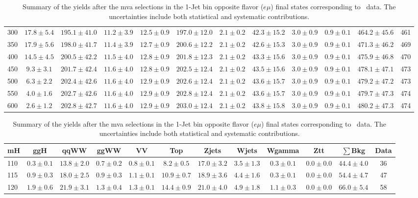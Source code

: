 \begin{table}[!ht]
{\begin{center}
\begin{tabular}{l c c c c c c c c c c c }
300 & $17.8\pm5.4$ & $195.1\pm41.0$ & $11.2\pm3.9$ & $12.5\pm0.9$ & $197.0\pm12.0$ & $2.1\pm0.2$ & $42.3\pm15.2$ & $3.0\pm0.9$ & $0.9\pm0.1$ & $464.2\pm45.6$ & 461 \\
350 & $17.9\pm5.6$ & $198.0\pm41.7$ & $11.4\pm3.9$ & $12.7\pm0.9$ & $200.6\pm12.2$ & $2.1\pm0.2$ & $42.6\pm15.3$ & $3.0\pm0.9$ & $0.9\pm0.1$ & $471.3\pm46.2$ & 469 \\
400 & $14.5\pm4.5$ & $200.5\pm42.2$ & $11.5\pm4.0$ & $12.8\pm0.9$ & $201.8\pm12.3$ & $2.1\pm0.2$ & $43.3\pm15.6$ & $3.0\pm0.9$ & $0.9\pm0.1$ & $475.9\pm46.8$ & 470 \\
450 & $9.3\pm3.1$ & $201.7\pm42.4$ & $11.6\pm4.0$ & $12.8\pm0.9$ & $202.5\pm12.4$ & $2.1\pm0.2$ & $43.5\pm15.6$ & $3.0\pm0.9$ & $0.9\pm0.1$ & $478.1\pm47.1$ & 473 \\
500 & $6.3\pm2.2$ & $202.4\pm42.6$ & $11.6\pm4.0$ & $12.9\pm0.9$ & $202.6\pm12.4$ & $2.1\pm0.2$ & $43.6\pm15.7$ & $3.0\pm0.9$ & $0.9\pm0.1$ & $479.2\pm47.2$ & 473 \\
550 & $4.0\pm1.6$ & $202.7\pm42.6$ & $11.6\pm4.0$ & $12.9\pm0.9$ & $202.8\pm12.4$ & $2.1\pm0.2$ & $43.6\pm15.7$ & $3.0\pm0.9$ & $0.9\pm0.1$ & $479.7\pm47.3$ & 474 \\
600 & $2.6\pm1.2$ & $202.8\pm42.7$ & $11.6\pm4.0$ & $12.9\pm0.9$ & $203.0\pm12.4$ & $2.1\pm0.2$ & $43.8\pm15.8$ & $3.0\pm0.9$ & $0.9\pm0.1$ & $480.2\pm47.3$ & 474 \\
\hline
\end{tabular}
\end{center}
}
\caption{Summary of the yields after the mva selections in the 1-Jet bin opposite flavor ($e\mu$) final states corresponding to \intlumi\ data. The uncertainties include 
both statistical and systematic contributions. }
{%
 \tiny
 \begin{center}
 \begin{tabular}{l c c c c c c c c c c c }
 \hline
 mH & ggH & qqWW & ggWW & VV & Top & Zjets & Wjets & Wgamma & Ztt & $\sum$Bkg & Data \\
 \hline
110 & $0.3\pm0.1$ & $13.8\pm2.0$ & $0.7\pm0.2$ & $0.8\pm0.1$ & $8.2\pm0.5$ & $17.0\pm3.2$ & $3.5\pm1.3$ & $0.3\pm0.1$ & $0.0\pm0.0$ & $44.4\pm4.0$ & 36 \\
115 & $0.9\pm0.3$ & $18.0\pm2.5$ & $0.9\pm0.3$ & $1.1\pm0.1$ & $10.9\pm0.7$ & $18.9\pm3.6$ & $4.4\pm1.6$ & $0.3\pm0.1$ & $0.0\pm0.0$ & $54.4\pm4.7$ & 47 \\
120 & $1.9\pm0.6$ & $21.9\pm3.1$ & $1.3\pm0.4$ & $1.3\pm0.1$ & $14.4\pm0.9$ & $21.0\pm4.0$ & $4.9\pm1.8$ & $1.1\pm0.3$ & $0.0\pm0.0$ & $66.0\pm5.4$ & 58 \\

\end{tabular}
\end{center}}
\end{table}
